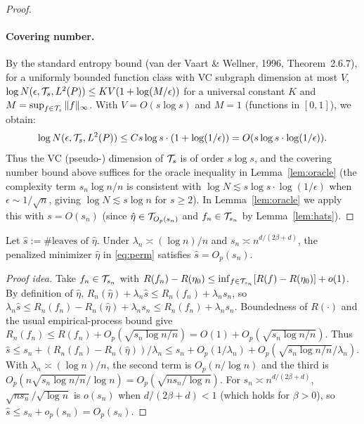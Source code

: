 \documentclass[12pt]{article}
\begin{document}
\begin{proof}
\paragraph{Covering number.}
By the standard entropy bound (van der Vaart \& Wellner, 1996, Theorem~2.6.7), for a uniformly bounded function class with VC subgraph dimension at most $V$, $\log N(\epsilon, \mathcal{T}_s, L^2(P)) \le K V (1 + \log(M/\epsilon))$ for a universal constant $K$ and $M = \sup_{f \in \mathcal{T}_s} \|f\|_\infty$. With $V = O(s \log s)$ and $M = 1$ (functions in $[0,1]$), we obtain:
\[
\log N(\epsilon, \mathcal{T}_s, L^2(P)) \le C s \log s \cdot (1 + \log(1/\epsilon)) = O(s \log s \cdot \log(1/\epsilon)).
\]
Thus the VC (pseudo-) dimension of $\mathcal{T}_s$ is of order $s \log s$, and the covering number bound above suffices for the oracle inequality in Lemma~\ref{lem:oracle} (the complexity term $s_n \log n / n$ is consistent with $\log N \lesssim s \log s \cdot \log(1/\epsilon)$ when $\epsilon \sim 1/\sqrt{n}$, giving $\log N \lesssim s \log n$ for $s \ge 2$). In Lemma~\ref{lem:oracle} we apply this with $s = O(s_n)$ (since $\hat\eta \in \mathcal{T}_{O_p(s_n)}$ and $f_n \in \mathcal{T}_{s_n}$ by Lemma~\ref{lem:hats}).
\end{proof}

\begin{lemma}
\label{lem:hats}
Let $\hat{s} := \#\text{leaves of }\hat\eta$. Under $\lambda_n \asymp (\log n)/n$ and $s_n \asymp n^{d/(2\beta+d)}$, the penalized minimizer $\hat\eta$ in \eqref{eq:perm} satisfies $\hat{s} = O_p(s_n)$.
\end{lemma}
\begin{proof}[Proof idea]
Take $f_n \in \mathcal{T}_{s_n}$ with $R(f_n) - R(\eta_0) \le \inf_{f \in \mathcal{T}_{s_n}}[R(f)-R(\eta_0)] + o(1)$. By definition of $\hat\eta$, $R_n(\hat\eta) + \lambda_n \hat{s} \le R_n(f_n) + \lambda_n s_n$, so $\lambda_n \hat{s} \le R_n(f_n) - R_n(\hat\eta) + \lambda_n s_n \le R_n(f_n) + \lambda_n s_n$. Boundedness of $R(\cdot)$ and the usual empirical-process bound give $R_n(f_n) \le R(f_n) + O_p(\sqrt{s_n \log n / n}) = O(1) + O_p(\sqrt{s_n \log n / n})$. Thus $\hat{s} \le s_n + (R_n(f_n) - R_n(\hat\eta))/\lambda_n \le s_n + O_p(1/\lambda_n) + O_p(\sqrt{s_n \log n / n}/\lambda_n)$. With $\lambda_n \asymp (\log n)/n$, the second term is $O_p(n/\log n)$ and the third is $O_p(n \sqrt{s_n \log n / n} / \log n) = O_p(\sqrt{n s_n / \log n})$. For $s_n \asymp n^{d/(2\beta+d)}$, $\sqrt{n s_n}/\sqrt{\log n}$ is $o(s_n)$ when $d/(2\beta+d) < 1$ (which holds for $\beta > 0$), so $\hat{s} \le s_n + o_p(s_n) = O_p(s_n)$.
\end{proof}
\end{document}
